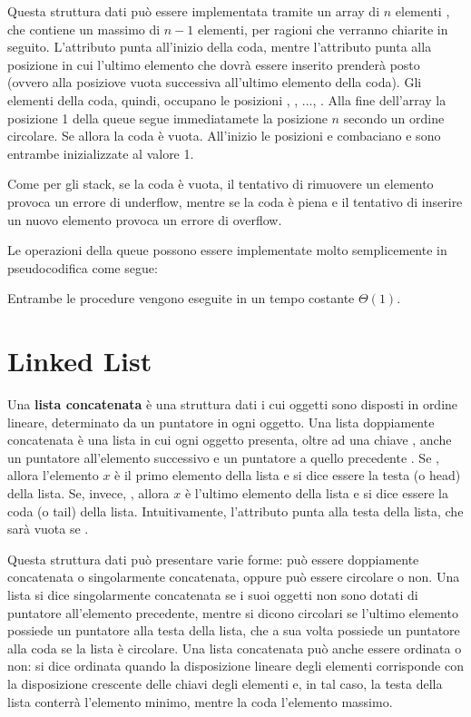 Questa struttura dati può essere implementata tramite un array di \(n\) elementi , che contiene un massimo di \(n-1\) elementi, per ragioni che verranno chiarite in seguito. L'attributo  punta all'inizio della coda, mentre l'attributo  punta alla posizione in cui l'ultimo elemento che dovrà essere inserito prenderà posto (ovvero alla posiziove vuota successiva all'ultimo elemento della coda). Gli elementi della coda, quindi, occupano le posizioni , , ..., . Alla fine dell'array la posizione 1 della queue segue immediatamete la posizione \(n\) secondo un ordine circolare. Se  allora la coda è vuota. All'inizio le posizioni  e  combaciano e sono entrambe inizializzate al valore 1.

Come per gli stack, se la coda è vuota, il tentativo di rimuovere un elemento provoca un errore di underflow, mentre se  la coda è piena e il tentativo di inserire un nuovo elemento provoca un errore di overflow. 

Le operazioni della queue possono essere implementate molto semplicemente in pseudocodifica come segue:





Entrambe le procedure vengono eseguite in un tempo costante \(\Theta(1)\).

\section{Linked List}
Una \textbf{lista concatenata} è una struttura dati i cui oggetti sono disposti in ordine lineare, determinato da un puntatore in ogni oggetto. Una lista doppiamente concatenata è una lista in cui ogni oggetto presenta, oltre ad una chiave , anche un puntatore all'elemento successivo  e un puntatore a quello precedente . Se , allora l'elemento \(x\) è il primo elemento della lista e si dice essere la testa (o head) della lista. Se, invece, , allora \(x\) è l'ultimo elemento della lista e si dice essere la coda (o tail) della lista. Intuitivamente, l'attributo  punta alla testa della lista, che sarà vuota se .

Questa struttura dati può presentare varie forme: può essere doppiamente concatenata o singolarmente concatenata, oppure può essere circolare o non. Una lista si dice singolarmente concatenata se i suoi oggetti non sono dotati di puntatore all'elemento precedente, mentre si dicono circolari se l'ultimo elemento possiede un puntatore alla testa della lista, che a sua volta possiede un puntatore alla coda se la lista è circolare. Una lista concatenata può anche essere ordinata o non: si dice ordinata quando la disposizione lineare degli elementi corrisponde con la disposizione crescente delle chiavi degli elementi e, in tal caso, la testa della lista conterrà l'elemento minimo, mentre la coda l'elemento massimo. 

